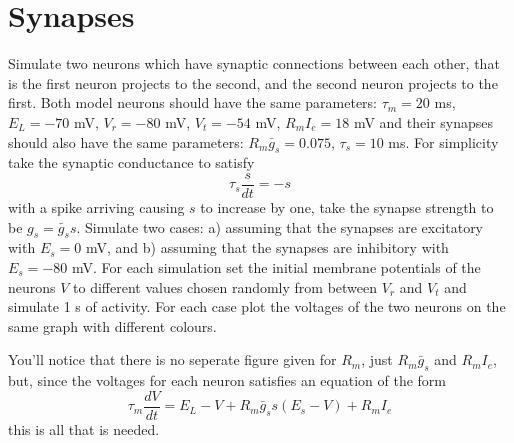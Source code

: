 \documentclass[12pt]{article}
\begin{document}
\section*{Synapses}

Simulate two neurons which have synaptic connections between each
other, that is the first neuron projects to the second, and the second
neuron projects to the first. Both model neurons should have the same
parameters: $\tau_m = 20$ ms, $E_L = -70$ mV, $V_r = -80$ mV, $V_t =
-54$ mV, $R_mI_e = 18$ mV and their synapses should also have the same
parameters: $R_m \bar{g}_s = 0.075$, $\tau_s= 10$ ms. For simplicity
take the synaptic conductance to satisfy
\begin{equation}
\tau_s\frac{s}{dt}=-s
\end{equation}
with a spike arriving causing $s$ to increase by one, take the synapse
strength to be $g_s=\bar{g}_s s$. Simulate two cases: a) assuming that
the synapses are excitatory with $E_s = 0$ mV, and b) assuming that
the synapses are inhibitory with $E_s = -80$ mV. For each simulation
set the initial membrane potentials of the neurons $V$ to different
values chosen randomly from between $V_r$ and $V_t$ and simulate 1 s
of activity. For each case plot the voltages of the two neurons on the
same graph with different colours.

You'll notice that there is no seperate figure given for $R_m$, just
$R_m \bar{g}_s$ and $R_m I_e$, but, since the voltages for each neuron
satisfies an equation of the form
\begin{equation}
  \tau_m \frac{dV}{dt}= E_L-V+R_m\bar{g}_s s(E_s-V)+R_mI_e
\end{equation}
this is all that is needed.
\end{document}

